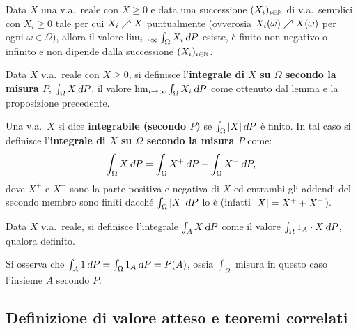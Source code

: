 \begin{multicols*}{2}
\begin{proposition}
    Data $X$ una v.a.~reale con $X \geq 0$ e data una successione $(X_i)_{i \in \mathbb{N}}$ di
    v.a.~semplici con $X_i \geq 0$ tale per cui $X_i \nearrow X$ puntualmente (ovverosia
    $X_i(\omega) \nearrow X(\omega)$ per ogni $\omega \in \Omega$), allora il
    valore $\lim_{i \to \infty} \int_\Omega X_i \dP$ esiste, è finito non negativo o infinito e
    non dipende dalla successione $(X_i)_{i \in \mathbb{N}}$.
\end{proposition}

\begin{definition}
    Data $X$ v.a.~reale con $X \geq 0$, si definisce l'\textbf{integrale di $X$
    su $\Omega$ secondo la misura $P$},
    $\int_\Omega X \dP$, il valore $\lim_{i \to \infty} \int_\Omega X_i \dP$ come
    ottenuto dal lemma e la proposizione precedente.
\end{definition}

\begin{definition}
    Una v.a.~$X$ si dice \textbf{integrabile (secondo $P$)} se
    $\int_\Omega \abs{X} \dP$ è finito. In tal caso si definisce
    l'\textbf{integrale di $X$ su $\Omega$ secondo la misura $P$} come:
    \[
        \int_\Omega X \dP = \int_\Omega X^+ \dP - \int_\Omega X^- \dP,
    \]
    dove $X^+$ e $X^-$ sono la parte positiva e negativa di $X$ ed
    entrambi gli addendi del secondo membro sono finiti dacché
    $\int_\Omega \abs{X} \dP$ lo è (infatti $\left\lvert X \right\rvert = X^+ + X^-$).
\end{definition}

\begin{definition}
    Data $X$ v.a.~reale, si definisce l'integrale $\int_A X \dP$ come il valore
    $\int_\Omega 1_A \cdot X \dP$, qualora definito.
\end{definition}

\begin{remark}
    Si osserva che $\int_A 1 \dP = \int_\Omega 1_A \dP = P(A)$, ossia
    $\int_\Omega$ misura in questo caso l'insieme $A$ secondo $P$.
\end{remark}

\subsection{Definizione di valore atteso e teoremi correlati}


\end{multicols*}
